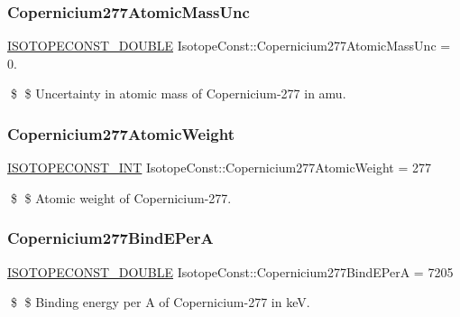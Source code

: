 \subsubsection{\texorpdfstring{Copernicium277\+Atomic\+Mass\+Unc}{Copernicium277AtomicMassUnc}}
{\footnotesize\ttfamily \mbox{\hyperlink{group___isotope_const-_macros_ga8f45a7272ce02c0b4c65c44636ed719a}{I\+S\+O\+T\+O\+P\+E\+C\+O\+N\+S\+T\+\_\+\+D\+O\+U\+B\+LE}} Isotope\+Const\+::\+Copernicium277\+Atomic\+Mass\+Unc = 0.}

\$ \$ Uncertainty in atomic mass of Copernicium-\/277 in amu. \mbox{\label{group___isotope_const-_copernicium-_cn277_ga9f2bd85cc629fa5b0df122317099617f}} 
\subsubsection{\texorpdfstring{Copernicium277\+Atomic\+Weight}{Copernicium277AtomicWeight}}
{\footnotesize\ttfamily \mbox{\hyperlink{group___isotope_const-_macros_ga5f18360b3e99483a35c32d789e62621c}{I\+S\+O\+T\+O\+P\+E\+C\+O\+N\+S\+T\+\_\+\+I\+NT}} Isotope\+Const\+::\+Copernicium277\+Atomic\+Weight = 277}

\$ \$ Atomic weight of Copernicium-\/277. \mbox{\label{group___isotope_const-_copernicium-_cn277_ga5478c055e1e3d308a69c7c0970278def}} 
\subsubsection{\texorpdfstring{Copernicium277\+Bind\+E\+PerA}{Copernicium277BindEPerA}}
{\footnotesize\ttfamily \mbox{\hyperlink{group___isotope_const-_macros_ga8f45a7272ce02c0b4c65c44636ed719a}{I\+S\+O\+T\+O\+P\+E\+C\+O\+N\+S\+T\+\_\+\+D\+O\+U\+B\+LE}} Isotope\+Const\+::\+Copernicium277\+Bind\+E\+PerA = 7205}

\$ \$ Binding energy per A of Copernicium-\/277 in keV. \mbox{\label{group___isotope_const-_copernicium-_cn277_gaaa82ad4e6531b01892d9d83a22883784}} 
